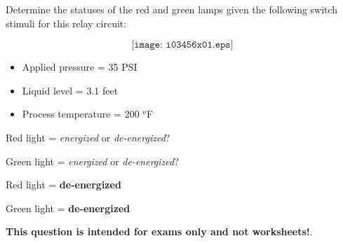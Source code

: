 

Determine the statuses of the red and green lamps given the following switch stimuli for this relay circuit:

$$\texttt{[image: i03456x01.eps]}$$

\begin{itemize}
\item{} Applied pressure = 35 PSI
\item{} Liquid level = 3.1 feet
\item{} Process temperature = 200 $^{o}$F
\end{itemize}

\vskip 10pt

Red light = {\it energized} or {\it de-energized}?

\vskip 10pt

Green light = {\it energized} or {\it de-energized}?







Red light = {\bf de-energized}

Green light = {\bf de-energized}







{\bf This question is intended for exams only and not worksheets!}.


